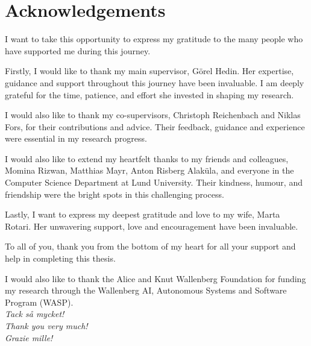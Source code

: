 \chapter{Acknowledgements}
\label{chap:acknowledgements}
I want to take this opportunity to express my gratitude to the many people who 
have supported me during this journey. 

Firstly, I would like to thank my main supervisor, 
G\"{o}rel Hedin. Her expertise, guidance and support throughout this journey have been invaluable.
I am deeply grateful for the time, patience, and effort she invested in shaping my research.

I would also like to thank my co-supervisors, Christoph Reichenbach and Niklas Fors,
for their contributions and advice. Their feedback, guidance and experience were essential 
in my research progress.

I would also like to extend my heartfelt thanks to my friends and colleagues, Momina Rizwan, 
Matthias Mayr, Anton Risberg Alak\"{u}la, and everyone in the Computer Science 
Department at Lund University. Their kindness, humour, and friendship were the 
bright spots in this challenging process.

Lastly, I want to express my deepest gratitude and love to my wife, Marta Rotari. 
Her unwavering support, love and encouragement have been invaluable. 

To all of you, thank you from the bottom of my heart for all your support and help
in completing this thesis.

I would also like to thank the Alice and Knut Wallenberg Foundation for funding my 
research through the Wallenberg AI, Autonomous Systems and Software Program (WASP).\\[5pt]


\hfill \emph{Tack s\r{a} mycket!}\\

\hfill \emph{Thank you very much!}\\

\hfill \emph{Grazie mille!}\\